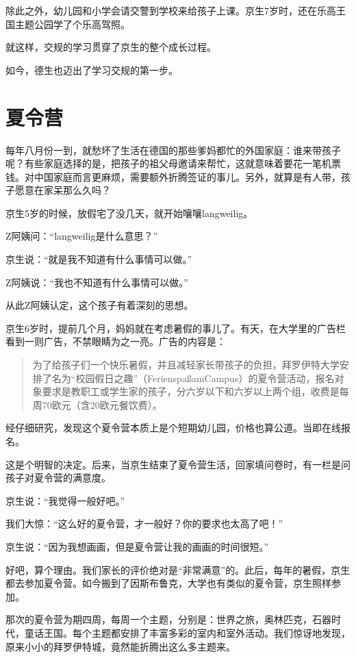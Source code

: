 \documentclass[twoside,openright,headings=optiontohead]{ctexbook} %
\begin{document}
{除此之外，幼儿园和小学会请交警到学校来给孩子上课。京生7岁时，还在乐高王国主题公园学了个乐高驾照。

就这样，交规的学习贯穿了京生的整个成长过程。

如今，德生也迈出了学习交规的第一步。

\chapter*{夏令营}\label{summer-camp}

每年八月份一到，就愁坏了生活在德国的那些爹妈都忙的外国家庭：谁来带孩子呢？有些家庭选择的是，把孩子的祖父母邀请来帮忙，这就意味着要花一笔机票钱。对中国家庭而言更麻烦，需要额外折腾签证的事儿。另外，就算是有人带，孩子愿意在家呆那么久吗？

京生5岁的时候，放假宅了没几天，就开始嚷嚷langweilig。

Z阿姨问：``langweilig是什么意思？''

京生说：``就是我不知道有什么事情可以做。''

Z阿姨说：``我也不知道有什么事情可以做。''

从此Z阿姨认定，这个孩子有着深刻的思想。

京生6岁时，提前几个月，妈妈就在考虑暑假的事儿了。有天，在大学里的广告栏看到一则广告，不禁眼睛为之一亮。广告的内容是：

\begin{quote}
为了给孩子们一个快乐暑假，并且减轻家长带孩子的负担，拜罗伊特大学安排了名为``校园假日之趣''（FerienspaßamCampus）的夏令营活动，报名对象要求是教职工或学生家的孩子，分六岁以下和六岁以上两个组，收费是每周70欧元（含20欧元餐饮费）。
\end{quote}

经仔细研究，发现这个夏令营本质上是个短期幼儿园，价格也算公道。当即在线报名。

这是个明智的决定。后来，当京生结束了夏令营生活，回家填问卷时，有一栏是问孩子对夏令营的满意度。

京生说：``我觉得一般好吧。''

我们大惊：``这么好的夏令营，才一般好？你的要求也太高了吧！''

京生说：``因为我想画画，但是夏令营让我的画画的时间很短。''

好吧，算个理由。我们家长的评价绝对是``非常满意''的。此后，每年的暑假，京生都去参加夏令营。如今搬到了因斯布鲁克，大学也有类似的夏令营，京生照样参加。

那次的夏令营为期四周，每周一个主题，分别是：世界之旅，奥林匹克，石器时代，童话王国。每个主题都安排了丰富多彩的室内和室外活动。我们惊讶地发现，原来小小的拜罗伊特城，竟然能折腾出这么多主题来。

}
\end{document}
